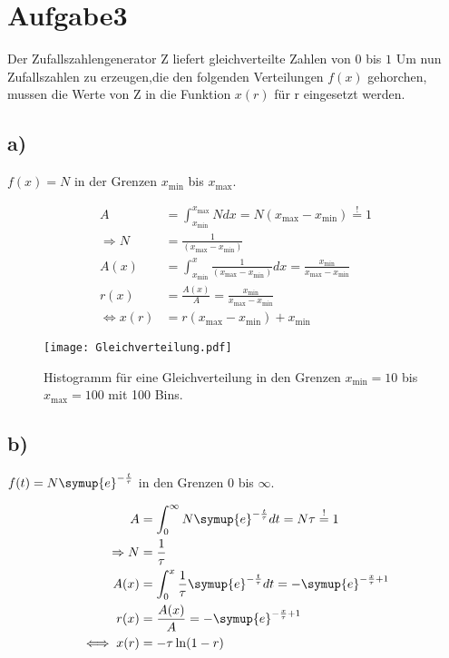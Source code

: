 \newpage
\section{Aufgabe3}
\label{sec:a3}
Der Zufallszahlengenerator Z liefert gleichverteilte Zahlen von $0$ bis $1$
Um nun Zufallszahlen zu erzeugen,die den folgenden Verteilungen $f(x)$ gehorchen,
mussen die Werte von Z in die Funktion $x(r)$ für r eingesetzt werden.


\subsection{a)}
\label{subsec:a3a}
$f(x)=N$ in der Grenzen $x_\text{min}$ bis $x_\text{max}$.

\begin{align}
A&=\int_{x_\text{min}}^{x_\text{max}} N dx=
N(x_\text{max}-x_\text{min})\stackrel{!}{=}1\\
\Rightarrow N&=\frac{1}{(x_\text{max}-x_\text{min})}\\
A(x)&=\int_{x_\text{min}}^{x}\frac{1}{(x_\text{max}-x_\text{min})}dx=\frac{x_\text{min}}{x_\text{max}-x_\text{min}}\\
r(x)&=\frac{A(x)}{A}=\frac{x_\text{min}}{x_\text{max}-x_\text{min}}\\
\iff x(r)&=r(x_\text{max}-x_\text{min})+x_\text{min}
\end{align}


\begin{figure}
  \centering
  \texttt{[image: Gleichverteilung.pdf]}
  \caption{Histogramm für eine Gleichverteilung in den Grenzen $x_\text{min}=10$ bis $x_\text{max}=100$ mit 100 Bins.}
  \label{fig:gleich}
\end{figure}
\FloatBarrier

\subsection{b)}
\label{subsec:a3b}
$f(t)=N\symup{e}^{-\frac{t}{\tau}}$ in den Grenzen $0$ bis $\infty$.

\begin{align}
A&=\int_0^{\infty}N\symup{e}^{-\frac{t}{\tau}}dt=N\tau\stackrel{!}{=}1\\
\Rightarrow N&=\frac{1}{\tau}\\
A(x)&=\int_0^x \frac{1}{\tau}\symup{e}^{-\frac{t}{\tau}}dt=-\symup{e}^{-\frac{x}{\tau}+1}\\
r(x)&=\frac{A(x)}{A}=-\symup{e}^{-\frac{x}{\tau}+1}\\
\iff x(r)&=-\tau\ln(1-r)
\end{align}


